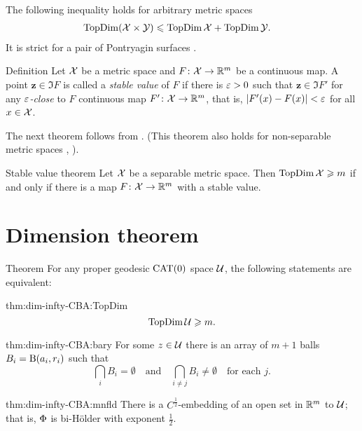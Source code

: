 The following inequality holds for arbitrary metric spaces
\begin{align*}
\mathop{\rm TopDim}\nolimits  (\mathcal{X}\times\mathcal{Y})
&\leqslant 
\mathop{\rm TopDim}\nolimits \mathcal{X}+ \mathop{\rm TopDim}\nolimits\mathcal{Y}.
\end{align*}
It is strict for a pair of Pontryagin surfaces \cite{pontyagin-surface}.

\medskip

\begin{thm}{Definition}
Let $\mathcal{X}$ be a metric space
and $F\colon\mathcal{X}\to\mathbb{R}^m$ be  a continuous map.
A point $\bm{z}\in \Im F$ is called a \emph{stable value} of $F$
if there is $\varepsilon>0$ such that $\bm{z}\in\Im F'$ 
for any \emph{$\varepsilon$-close} to $F$ continuous map $F'\colon\mathcal{X}\to\mathbb{R}^m$,
that is, $|F'(x)-F(x)|<\varepsilon$ for all $x\in \mathcal{X}$.
\end{thm}



The next theorem follows from \cite[theorems VI 1$\&$2]{hurewicz-wallman}.
(This theorem also holds for non-separable metric spaces \cite{nagata}, \cite[3.2.10]{engelking}). 

\begin{thm}{Stable value theorem}\label{thm:stable-value}
Let $\mathcal{X}$ be a separable metric space.
Then $\mathop{\rm TopDim}\nolimits\mathcal{X}\geqslant m$ if and only if there is a map $F\colon\mathcal{X}\to\mathbb{R}^{m}$ with a stable value.
\end{thm}

\section{Dimension theorem}\label{sec:dim-CAT}

\begin{thm}{Theorem}\label{thm:dim-infty-CBA}
For any proper geodesic $\mathrm{CAT}(0)$ space $\mathcal{U}$, the following statements are equivalent:

\begin{subthm}{thm:dim-infty-CBA:TopDim}
\[\mathop{\rm TopDim}\nolimits \mathcal{U}\geqslant m.\]
\end{subthm}

\begin{subthm}{thm:dim-infty-CBA:bary} 
For some $z\in \mathcal{U}$ there is an array of $m+1$ balls $B_i\z=\oBall(a_i,r_i)$ 
such that 
\[\bigcap_i B_i=\emptyset
\quad\text{and}\quad
\bigcap_{i\ne j} B_i\ne \emptyset
\quad \text{for each $j$}.\]

\end{subthm}


\begin{subthm}{thm:dim-infty-CBA:mnfld} 
There is a $C^{\frac{1}{2}}$-embedding of an open set in $\mathbb{R}^m$ to $\mathcal{U}$;
that is, $\Phi$ is bi-Hölder with exponent $\tfrac{1}{2}$.
\end{subthm}

\end{thm}


